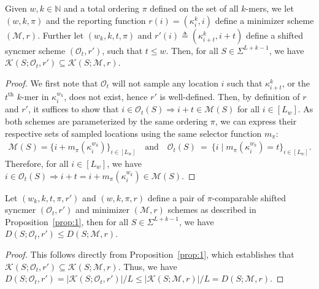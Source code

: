 \begin{proposition}
Given $w, k \in \mathbb{N}$ and a total ordering $\pi$ defined on the set of all $k$-mers, we let $(w, k, \pi)$ and the reporting function $r(i)=(\kappa^k_i, i)$ define a minimizer scheme $(\mathcal{M}, r)$. Further let $(w_k,k,t,\pi)$ and $r'(i) \triangleq (\kappa^k_{i+t}, i+t)$ define a shifted syncmer scheme $(\mathcal{O}_t, r')$, such that $t \leq w$. Then, for all $S \in \Sigma^{L+k-1}$, we have $\mathcal{K}(S; \mathcal{O}_t, r') \subseteq \mathcal{K}(S; \mathcal{M}, r)$.
\label{prop:1}
\begin{proof} We first note that $\mathcal{O}_t$ will not sample any location $i$ such that $\kappa^k_{i+t}$, or the $t^{\text{th}}$ $k$-mer in $\kappa^{w_k}_i$, does not exist, hence $r'$ is well-defined. Then, by definition of $r$ and $r'$, it suffices to show that $i \in \mathcal{O}_t(S) \Rightarrow i + t \in \mathcal{M}(S)$ for all $i \in [L_w]$. As both schemes are parameterized by the same ordering $\pi$, we can express their respective sets of sampled locations using the same selector function $m_\pi$:
\begin{eqnarray}
\mathcal{M}(S) 
= \{i + m_\pi(\kappa^{w_k}_i)\}_{i \in [L_w]} \quad
\text{and} \quad 
\mathcal{O}_t(S) 
\ = \ \{i \mid m_\pi(\kappa^{w_k}_i) = t\}_{i \in [L_w]} .
\end{eqnarray} 
Therefore, for all $i\in [L_w]$, we have $i \in \mathcal{O}_t(S) \Rightarrow i + t = i + m_\pi(\kappa^{w_k}_i) \in \mathcal{M}(S)$.
\end{proof}
\end{proposition}
\begin{corollary} Let $(w_k,k,t,\pi, r')$ and $(w,k, \pi,r)$ define a pair of $\pi$-comparable shifted syncmer $(\mathcal{O}_t, r')$ and minimizer $(\mathcal{M}, r)$ schemes as described in Proposition~\ref{prop:1}, then for all $S \in \Sigma^{L+k-1}$, we have $D(S; \mathcal{O}_t, r') \leq D(S; \mathcal{M}, r)$. 
\begin{proof}
This follows directly from Proposition~\ref{prop:1}, which establishes that $\mathcal{K}(S; \mathcal{O}_t, r') \subseteq \mathcal{K}(S; \mathcal{M}, r)$. Thus, we have $D(S;\mathcal{O}_t,r') = |\mathcal{K}(S;\mathcal{O}_t,r')|/L \leq |\mathcal{K}(S;\mathcal{M},r)|/L = D(S;\mathcal{M},r)$.
\end{proof}
\label{cor:1}
\end{corollary}
